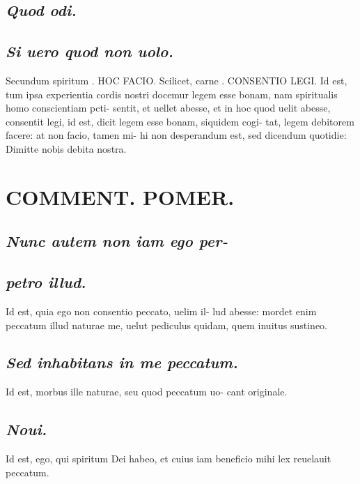 \documentclass{article}
\begin{document}
\begin{pages}
\subsection*{\textit{Quod odi. }}
{}
\subsection*{\textit{Si uero quod non uolo. }}\pstart Secundum spiritum . HOC FACIO.  Scilicet, carne . CONSENTIO LEGI.  Id est, tum ipsa experientia cordis nostri docemur legem esse bonam, nam spiritualis homo conscientiam pcti- sentit, et uellet abesse, et in hoc quod uelit abesse, consentit legi, id est, dicit legem esse bonam, siquidem cogi- tat, legem debitorem facere: at non facio, tamen mi- hi non desperandum est, sed dicendum quotidie: Dimitte nobis debita nostra.   \pend
\section*{COMMENT. POMER.  }
{}
\subsection*{\textit{Nunc autem non iam ego per- }}
{}
\subsection*{\textit{petro illud. }}\pstart Id est, quia ego non consentio peccato, uelim il- lud abesse: mordet enim peccatum illud naturae me, uelut pediculus quidam, quem inuitus sustineo.   \pend
{}
{}
\subsection*{\textit{Sed inhabitans in me peccatum. }}\pstart Id est, morbus ille naturae, seu quod peccatum uo- cant originale.   \pend
{}
{}
\subsection*{\textit{Noui. }}\pstart Id est, ego, qui spiritum Dei habeo, et cuius iam beneficio mihi lex reuelauit peccatum.   \pend
{}
{}

\end{pages}
\end{document}
